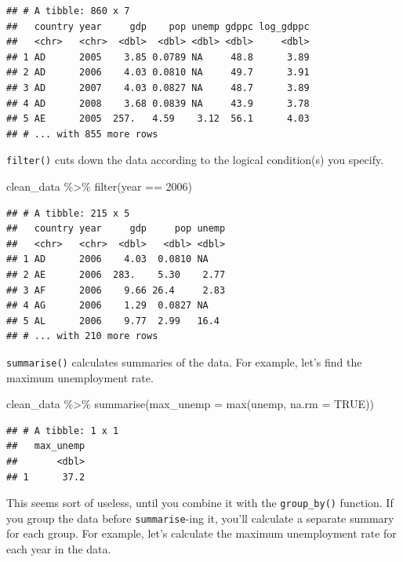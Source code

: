 \documentclass[
  12pt,
  oneside,openany]{book}
\newenvironment{Shaded}{\begin{snugshade}}{\end{snugshade}}
\newcommand{\AttributeTok}[1]{\textcolor[rgb]{0.77,0.63,0.00}{#1}}
\newcommand{\ConstantTok}[1]{\textcolor[rgb]{0.00,0.00,0.00}{#1}}
\newcommand{\DecValTok}[1]{\textcolor[rgb]{0.00,0.00,0.81}{#1}}
\newcommand{\FunctionTok}[1]{\textcolor[rgb]{0.00,0.00,0.00}{#1}}
\newcommand{\NormalTok}[1]{#1}
\newcommand{\SpecialCharTok}[1]{\textcolor[rgb]{0.00,0.00,0.00}{#1}}
\begin{document}
\begin{verbatim}
## # A tibble: 860 x 7
##   country year     gdp    pop unemp gdppc log_gdppc
##   <chr>   <chr>  <dbl>  <dbl> <dbl> <dbl>     <dbl>
## 1 AD      2005    3.85 0.0789 NA     48.8      3.89
## 2 AD      2006    4.03 0.0810 NA     49.7      3.91
## 3 AD      2007    4.03 0.0827 NA     48.7      3.89
## 4 AD      2008    3.68 0.0839 NA     43.9      3.78
## 5 AE      2005  257.   4.59    3.12  56.1      4.03
## # ... with 855 more rows
\end{verbatim}

\texttt{filter()} cuts down the data according to the logical condition(s) you specify.

\begin{Shaded}
\begin{Highlighting}[]
\NormalTok{clean\_data }\SpecialCharTok{\%\textgreater{}\%}
  \FunctionTok{filter}\NormalTok{(year }\SpecialCharTok{==} \DecValTok{2006}\NormalTok{)}
\end{Highlighting}
\end{Shaded}

\begin{verbatim}
## # A tibble: 215 x 5
##   country year     gdp     pop unemp
##   <chr>   <chr>  <dbl>   <dbl> <dbl>
## 1 AD      2006    4.03  0.0810 NA   
## 2 AE      2006  283.    5.30    2.77
## 3 AF      2006    9.66 26.4     2.83
## 4 AG      2006    1.29  0.0827 NA   
## 5 AL      2006    9.77  2.99   16.4 
## # ... with 210 more rows
\end{verbatim}

\texttt{summarise()} calculates summaries of the data. For example, let's find the maximum unemployment rate.

\begin{Shaded}
\begin{Highlighting}[]
\NormalTok{clean\_data }\SpecialCharTok{\%\textgreater{}\%}
  \FunctionTok{summarise}\NormalTok{(}\AttributeTok{max\_unemp =} \FunctionTok{max}\NormalTok{(unemp, }\AttributeTok{na.rm =} \ConstantTok{TRUE}\NormalTok{))}
\end{Highlighting}
\end{Shaded}

\begin{verbatim}
## # A tibble: 1 x 1
##   max_unemp
##       <dbl>
## 1      37.2
\end{verbatim}

This seems sort of useless, until you combine it with the \texttt{group\_by()} function. If you group the data before \texttt{summarise}-ing it, you'll calculate a separate summary for each group. For example, let's calculate the maximum unemployment rate for each year in the data.
\end{document}
